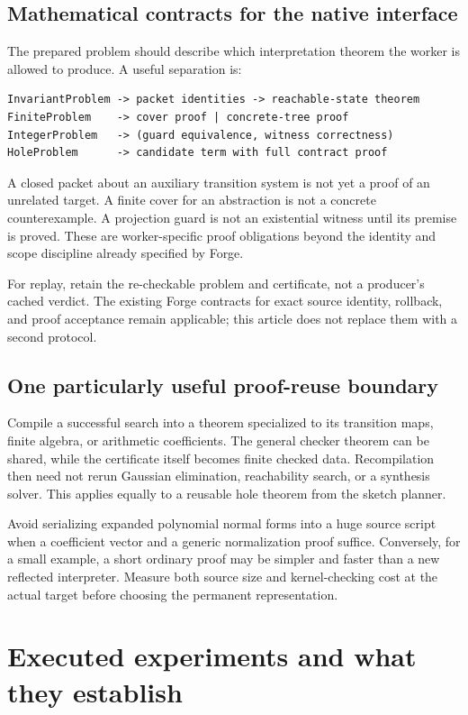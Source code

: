 \subsection{Mathematical contracts for the native interface}
The prepared problem should describe which interpretation theorem the worker is
allowed to produce. A useful separation is:
\begin{lstlisting}
InvariantProblem -> packet identities -> reachable-state theorem
FiniteProblem    -> cover proof | concrete-tree proof
IntegerProblem   -> (guard equivalence, witness correctness)
HoleProblem      -> candidate term with full contract proof
\end{lstlisting}
A closed packet about an auxiliary transition system is not yet a proof of an
unrelated target. A finite cover for an abstraction is not a concrete
counterexample. A projection guard is not an existential witness until its
premise is proved. These are worker-specific proof obligations beyond the
identity and scope discipline already specified by Forge.

For replay, retain the re-checkable problem and certificate, not a producer's
cached verdict. The existing Forge contracts for exact source identity,
rollback, and proof acceptance remain applicable; this article does not replace
them with a second protocol.

\subsection{One particularly useful proof-reuse boundary}
Compile a successful search into a theorem specialized to its transition maps,
finite algebra, or arithmetic coefficients. The general checker theorem can be
shared, while the certificate itself becomes finite checked data. Recompilation
then need not rerun Gaussian elimination, reachability search, or a synthesis
solver. This applies equally to a reusable hole theorem from the sketch planner.

Avoid serializing expanded polynomial normal forms into a huge source script
when a coefficient vector and a generic normalization proof suffice. Conversely,
for a small example, a short ordinary proof may be simpler and faster than a
new reflected interpreter. Measure both source size and kernel-checking cost at
the actual target before choosing the permanent representation.

\section{Executed experiments and what they establish}
\label{sec:experiments}

